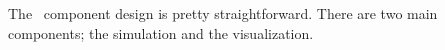 
The \fluids\ component design is pretty straightforward. There are two main
components; the simulation and the visualization. 

